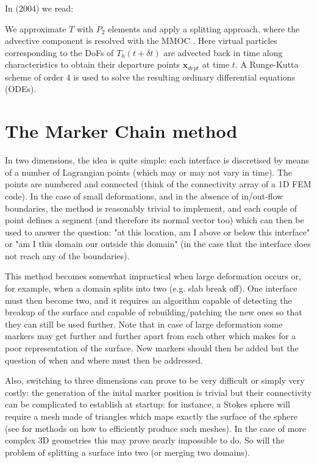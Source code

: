 In \textcite{ildk24} (2004) we read:
\begin{displayquote}
{\color{darkgray}
We approximate $T$ with $P_2$ elements and apply
a splitting approach, where the advective component is resolved with the
MMOC \cite{kome22}. Here virtual particles corresponding to the DoFs of $T_h(t +\delta t)$
are advected back in time along characteristics to obtain their departure points
${\bm x}_{dept}$ at time $t$. A Runge-Kutta scheme of order 4 is used to solve the resulting
ordinary differential equations (ODEs).}
\end{displayquote}

\section{The Marker Chain method}

In two dimensions, the idea is quite simple: each interface is discretised by means of a number
of Lagrangian points (which may or may not vary in time). The points are numbered and 
connected (think of the connectivity array of a 1D FEM code). In the case of small deformations, 
and in the absence of in/out-flow boundaries, the method is reasonably trivial to implement, and 
each couple of point defines a segment (and therefore its normal vector too) which can then be used
to answer the question: "at this location, am I above or below this interface" or "am I this domain our
outside this domain" (in the case that the interface does not reach any of the boundaries).

This method becomes somewhat impractical when large deformation occurs or, for example, 
when a domain splits into two (e.g. slab break off). One interface must then become two, 
and it requires an algorithm capable of detecting the breakup of the surface and capable 
of rebuilding/patching the new ones so that they can still be used further. 
Note that in case of large deformation some markers may get further and further apart 
from each other which makes for a poor representation of the surface. New markers should then 
be added but the question of when and where must then be addressed.

Also, switching to three dimensions can prove to be very difficult or simply very 
costly: the generation of the inital marker position is trivial but their connectivity 
can be complicated to establish at startup: for instance, a Stokes sphere will require
a mesh made of triangles which maps exactly the surface of the sphere (see \cite{thie18,moma19} 
for methods on how to efficiently produce such meshes). In the case of more complex 3D geometries
this may prove nearly impossible to do. So will the problem of splitting a surface into two 
(or merging two domains).  

